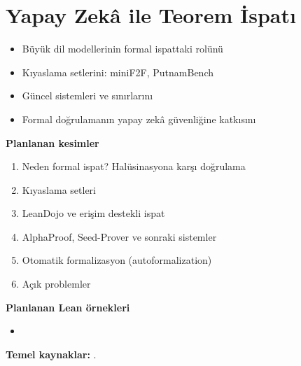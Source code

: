 \chapter{Yapay Zekâ ile Teorem İspatı}\label{bol:yapay-zeka}

\begin{bolumhedefleri}
\begin{itemize}
  \item Büyük dil modellerinin formal ispattaki rolünü
  \item Kıyaslama setlerini: miniF2F, PutnamBench
  \item Güncel sistemleri ve sınırlarını
  \item Formal doğrulamanın yapay zekâ güvenliğine katkısını
\end{itemize}
\end{bolumhedefleri}

\begin{taslakplan}
\textbf{Planlanan kesimler}
\begin{enumerate}[label=\thechapter.\arabic*, leftmargin=2.4em]
  \item Neden formal ispat? Halüsinasyona karşı doğrulama
  \item Kıyaslama setleri
  \item LeanDojo ve erişim destekli ispat
  \item AlphaProof, Seed-Prover ve sonraki sistemler
  \item Otomatik formalizasyon (autoformalization)
  \item Açık problemler
\end{enumerate}

\textbf{Planlanan Lean örnekleri}
\begin{itemize}
  \item {}
\end{itemize}

\textbf{Temel kaynaklar:} \citet{zheng2022minif2f,yang2023leandojo,tsoukalas2024putnambench,alphaproof2024,seedprover2025}.
\end{taslakplan}

